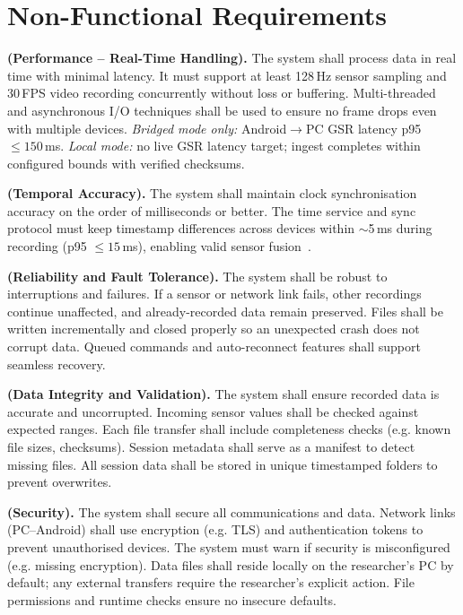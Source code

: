 \documentclass{report}
\begin{document}
    \section{Non-Functional Requirements}
    \begin{description}[leftmargin=0cm]
        \item \textbf{(Performance – Real-Time Handling).} The system shall process data in real time with minimal latency. It must support at least 128\,Hz sensor sampling and 30\,FPS video recording concurrently without loss or buffering. Multi-threaded and asynchronous I/O techniques shall be used to ensure no frame drops even with multiple devices. \emph{Bridged mode only:} Android$\rightarrow$PC GSR latency p95 $\leq 150$\,ms. \emph{Local mode:} no live GSR latency target; ingest completes within configured bounds with verified checksums.

        \item \textbf{(Temporal Accuracy).} The system shall maintain clock synchronisation accuracy on the order of milliseconds or better. The time service and sync protocol must keep timestamp differences across devices within $\sim$5\,ms during recording (p95 $\leq 15$\,ms), enabling valid sensor fusion~\cite{kothe2014lsl}.

        \item \textbf{(Reliability and Fault Tolerance).} The system shall be robust to interruptions and failures. If a sensor or network link fails, other recordings continue unaffected, and already-recorded data remain preserved. Files shall be written incrementally and closed properly so an unexpected crash does not corrupt data. Queued commands and auto-reconnect features shall support seamless recovery.

        \item \textbf{(Data Integrity and Validation).} The system shall ensure recorded data is accurate and uncorrupted. Incoming sensor values shall be checked against expected ranges. Each file transfer shall include completeness checks (e.g. known file sizes, checksums). Session metadata shall serve as a manifest to detect missing files. All session data shall be stored in unique timestamped folders to prevent overwrites.

        \item \textbf{(Security).} The system shall secure all communications and data. Network links (PC–Android) shall use encryption (e.g. TLS) and authentication tokens to prevent unauthorised devices. The system must warn if security is misconfigured (e.g. missing encryption). Data files shall reside locally on the researcher’s PC by default; any external transfers require the researcher’s explicit action. File permissions and runtime checks ensure no insecure defaults.


\end{description}
\end{document}
